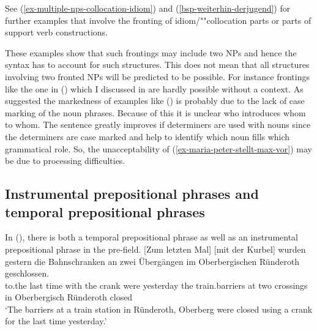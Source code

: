 See (\ref{ex-multiple-nps-collocation-idiom}) and (\ref{bsp-weiterhin-derjugend}) for further examples that involve the
fronting of idiom/""collocation parts or parts of support verb constructions.

These examples show that such frontings may include two NPs and hence the syntax has to account for
such structures. This does not mean that all structures involving two fronted NPs will be predicted
to be possible. For instance frontings like the one in () which I discussed in
 are hardly possible without a context.
\z
As \citet[]{Winkler2014a} suggested the markedness of examples like () is probably
due to the lack of case marking of the noun phrases. Because of this it is unclear who
introduces whom to whom. The sentence greatly improves if determiners are used with nouns since the
determiners are case marked and help to identify which noun fills which grammatical role.
\eal
{}
\zl
So, the unacceptability of (\ref{ex-maria-peter-stellt-max-vor}) may be due to processing
difficulties.


\subsection{Instrumental prepositional phrases and temporal prepositional phrases}

In (), there is both a temporal prepositional phrase as well as an instrumental prepositional phrase 
in the pre-field.
\ea
\label{bsp-instrument}
\gll {}[Zum letzten Mal] [mit der Kurbel] wurden gestern die Bahnschranken an zwei Übergängen im Oberbergischen Ründeroth geschlossen.\footnotemark\\
	 \spacebr{}to.the last time \spacebr{}with the crank were yesterday the train.barriers at two crossings in Oberbergisch Ründeroth closed\\
\glt `The barriers at a train station in Ründeroth, Oberberg were closed using a crank for the last time yesterday.'
\z

